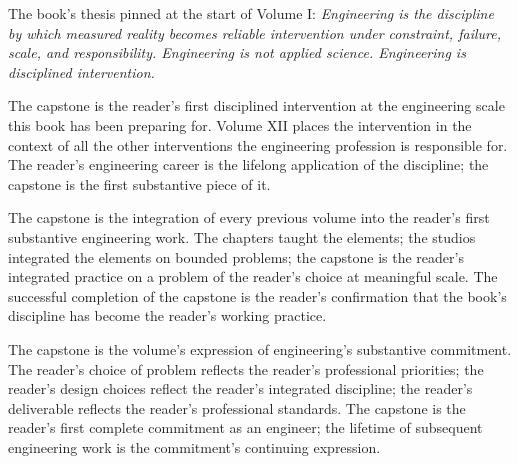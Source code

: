 The book's thesis pinned at the start of Volume I: \emph{Engineering is the discipline by which measured reality becomes reliable intervention under constraint, failure, scale, and responsibility. Engineering is not applied science. Engineering is disciplined intervention.}

The capstone is the reader's first disciplined intervention at the engineering scale this book has been preparing for. Volume XII places the intervention in the context of all the other interventions the engineering profession is responsible for. The reader's engineering career is the lifelong application of the discipline; the capstone is the first substantive piece of it.

\begin{principle}
The capstone is the integration of every previous volume into the reader's first substantive engineering work. The chapters taught the elements; the studios integrated the elements on bounded problems; the capstone is the reader's integrated practice on a problem of the reader's choice at meaningful scale. The successful completion of the capstone is the reader's confirmation that the book's discipline has become the reader's working practice.
\end{principle}

\begin{archetype}[ethics]
The capstone is the volume's expression of engineering's substantive commitment. The reader's choice of problem reflects the reader's professional priorities; the reader's design choices reflect the reader's integrated discipline; the reader's deliverable reflects the reader's professional standards. The capstone is the reader's first complete commitment as an engineer; the lifetime of subsequent engineering work is the commitment's continuing expression.
\end{archetype}

